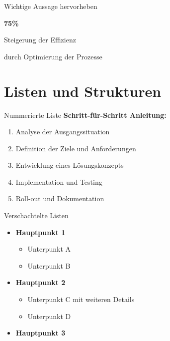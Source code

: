\documentclass[aspectratio=169,10pt]{beamer}
\begin{document}
\begin{frame}{Wichtige Aussage hervorheben}
\begin{center}
  \vspace{1cm}
  {\Huge \textcolor{HMRed}{\textbf{75\%}}}
  
  \vspace{0.5cm}
  {\Large Steigerung der Effizienz}
  
  \vspace{0.5cm}
  durch Optimierung der Prozesse
\end{center}
\end{frame}

\section{Listen und Strukturen}
\begin{frame}{Nummerierte Liste}
\textbf{Schritt-für-Schritt Anleitung:}
\begin{enumerate}
  \item Analyse der Ausgangssituation
  \item Definition der Ziele und Anforderungen
  \item Entwicklung eines Lösungskonzepts
  \item Implementation und Testing
  \item Roll-out und Dokumentation
\end{enumerate}
\end{frame}

\begin{frame}{Verschachtelte Listen}
\begin{itemize}
  \item \textbf{Hauptpunkt 1}
  \begin{itemize}
    \item Unterpunkt A
    \item Unterpunkt B
  \end{itemize}
  \item \textbf{Hauptpunkt 2}
  \begin{itemize}
    \item Unterpunkt C mit weiteren Details
    \item Unterpunkt D
  \end{itemize}
  \item \textbf{Hauptpunkt 3}
\end{itemize}
\end{frame}
\end{document}
